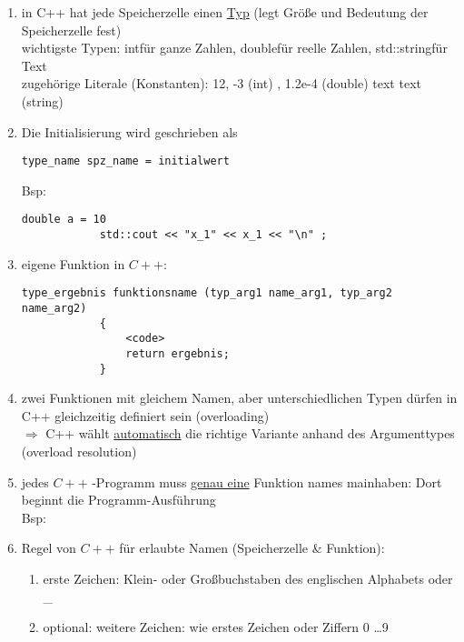 \documentclass{article}
\begin{document}
	\begin{enumerate}
		\item in C++ hat jede Speicherzelle einen \underline{Typ} (legt Größe und Bedeutung der Speicherzelle fest) \\
		wichtigste Typen: \grqq int\grqq  für ganze Zahlen, \grqq double\grqq  für reelle Zahlen, \grqq std::string\grqq  für Text \\ zugehörige Literale (Konstanten): 12, -3 (int)  , 1.2e-4 (double) \quad \grqq text text \grqq (string)
		\item Die Initialisierung wird geschrieben als
		\begin{lstlisting}[tabsize =2]
			type_name spz_name = initialwert
		\end{lstlisting}
		Bsp:
		\begin{lstlisting}[tabsize = 2]
			double a = 10
			std::cout << "x_1" << x_1 << "\n" ;
		\end{lstlisting} 
		\item eigene Funktion in $C++$: 

			\begin{lstlisting}[tabsize = 2]
			type_ergebnis funktionsname (typ_arg1 name_arg1, typ_arg2 name_arg2)
			{
				<code>
				return ergebnis;
			}
			\end{lstlisting}
			
		\item zwei Funktionen mit gleichem Namen, aber unterschiedlichen Typen dürfen in C++ gleichzeitig definiert sein (\grqq overloading\grqq) \\ $\Rightarrow$ C++ wählt \underline{automatisch} die richtige Variante anhand des Argumenttypes (\grqq overload resolution\grqq)
		
		\item jedes $C++$ -Programm muss \underline{genau eine} Funktion names \grqq main\grqq haben: Dort beginnt die Programm-Ausführung \\
		Bsp: \\
		
		\item Regel von $C++$ für erlaubte Namen (Speicherzelle \& Funktion):
		\begin{enumerate}
			\item erste Zeichen: Klein- oder Großbuchstaben des englischen Alphabets oder \_
			\item optional: weitere Zeichen: wie erstes Zeichen oder Ziffern 0 \dots 9
		\end{enumerate}
		

\end{enumerate}
\end{document}
